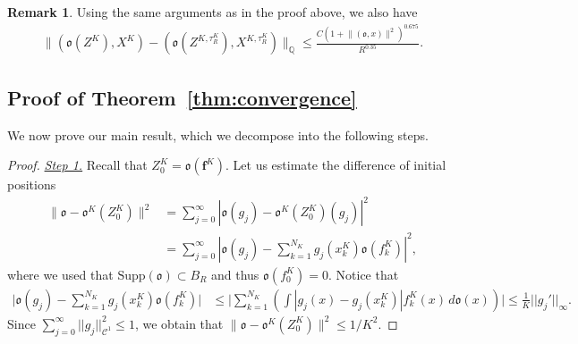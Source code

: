 \documentclass[11pt]{article}
\numberwithin{equation}{section}
\theoremstyle{plain}
\theoremstyle{definition}
\newtheorem{remark}{Remark}[section]
\DeclareMathOperator{\Q}{\mathbb{Q}}
\DeclareMathOperator{\calC}{\mathcal{C}}
\def\mo{\mathfrak{o}}
\begin{document}
\begin{remark}
Using the same arguments as in the proof above, we also have 
\begin{align*}
    \lVert (\mo(Z^K),X^K)-(\mo(Z^{K,\tau^K_R}),X^{K,\tau^K_R}) \rVert_{\Q} \leq  \frac{C (1+\lVert (\mo,x) \rVert^2)^{0.675}}{R^{0.35}}.
\end{align*}
\end{remark}

\subsection{Proof of Theorem~\ref{thm:convergence}}\label{sec:proofMain}
We now prove our main result, which we decompose into the following steps. 
\begin{proof}
\underline{\textit{Step 1.}} Recall that $Z^K_0=\mo(\bm{f}^K)$. Let us estimate the difference of initial positions 
\begin{align*}
    \lVert \mo-\mo^K(Z^K_0) \rVert^2 &=\sum_{j=0}^{\infty} |\mo(g_j)- \mo^K(Z_0^K)(g_j)|^2 \\
    &=\sum_{j=0}^{\infty} \left|\mo(g_j)- \sum_{k=1}^{N_K} g_j(x^K_k) \mo(f^K_k) \right|^2,
\end{align*}
where we used that $\text{Supp}(\mo) \subset B_R$ and thus $\mo(f^K_0)=0$. Notice that 
\begin{align*}
    \Big |\mo(g_j)- \sum_{k=1}^{N_K} g_j(x^K_k) \mo(f^K_k) \Big|& \leq \Big|\sum_{k=1}^{N_K} \left(\int |g_j(x)-g_j(x^K_k)| f^K_k(x) \, d \mo(x) \right) \Big| \leq \frac{1}{K} ||g_j'||_{\infty}.
\end{align*}
Since $\sum_{j=0}^{\infty} ||g_j||_{\calC^1}^2 \leq 1$, we obtain that  $\lVert \mo-\mo^K(Z^K_0) \rVert^2 \leq 1/K^2$. 



\end{proof}
\end{document}
